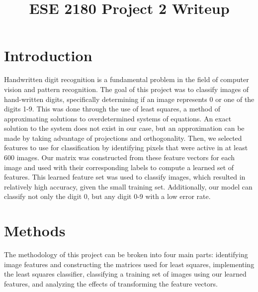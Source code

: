 \documentclass[conference]{IEEEtran}
\begin{document}
\title{ESE 2180 Project 2 Writeup}

\author{
\and
{}
\and
}

\maketitle


\section{Introduction}
Handwritten digit recognition is a fundamental problem in the field of computer vision and pattern recognition. The goal of this project was to classify images of hand-written digits, specifically determining if an image represents 0 or one of the digits 1-9. This was done through the use of least squares, a method of approximating solutions to overdetermined systems of equations. An exact solution to the system does not exist in our case, but an approximation can be made by taking advantage of projections and orthogonality. Then, we selected features to use for classification by identifying pixels that were active in at least 600 images. Our matrix was constructed from these feature vectors for each image and used with their corresponding labels to compute a learned set of features. This learned feature set was used to classify images, which resulted in relatively high accuracy, given the small training set. Additionally, our model can classify not only the digit 0, but any digit 0-9 with a low error rate. 

\section{Methods}
The methodology of this project can be broken into four main parts: identifying image features and constructing the matrices used for least squares, implementing the least squares classifier, classifying a training set of images using our learned features, and analyzing the effects of transforming the feature vectors. 
\end{document}
